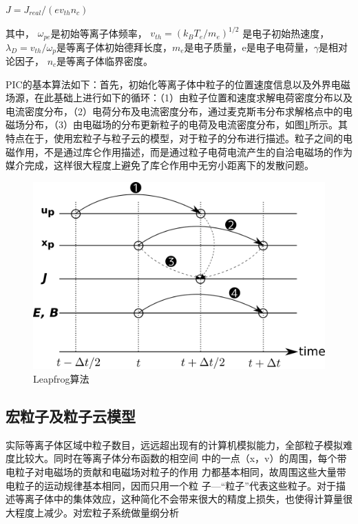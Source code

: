   $J=J_{real}/(ev_{th}n_c)$
  

  
其中， $\omega_{pe}$是初始等离子体频率， $v_{th}=(k_B T_e / m_e)^{1/2}$ 是电子初始热速度， $\lambda_D=v_{th}/ {\omega}_p$是等离子体初始德拜长度，$m_e$是电子质量，e是电子电荷量，$\gamma$是相对论因子， $n_c$是等离子体临界密度。
  


PIC的基本算法如下：首先，初始化等离子体中粒子的位置速度信息以及外界电磁场源，在此基础上进行如下的循环：（1）由粒子位置和速度求解电荷密度分布以及电流密度分布，（2）电荷分布及电流密度分布，通过麦克斯韦分布求解格点中的电磁场分布，（3）由电磁场的分布更新粒子的电荷及电流密度分布，如图\ref{fig:Leapfrog}所示。其特点在于，使用宏粒子与粒子云的模型，对于粒子的分布进行描述。粒子之间的电磁作用，不是通过库仑作用描述，而是通过粒子电荷电流产生的自洽电磁场的作为媒介完成，这样很大程度上避免了库仑作用中无穷小距离下的发散问题。
\begin{figure}[!htbp]
  \centering
  \includegraphics[width=\MyFactor\textwidth]{Img/leapfrog.eps}
  \caption{Leapfrog算法}
  \label{fig:Leapfrog}
\end{figure}

\subsection{宏粒子及粒子云模型}
实际等离子体区域中粒子数目，远远超出现有的计算机模拟能力，全部粒子模拟难度比较大。同时在等离子体分布函数的相空间
中的一点（x，v）的周围，每个带电粒子对电磁场的贡献和电磁场对粒子的作用
力都基本相同，故周围这些大量带电粒子的运动规律基本相同，因而只用一个粒
子---“粒子”代表这些粒子。对于描述等离子体中的集体效应，这种简化不会带来很大的精度上损失，也使得计算量很大程度上减少。对宏粒子系统做量纲分析


